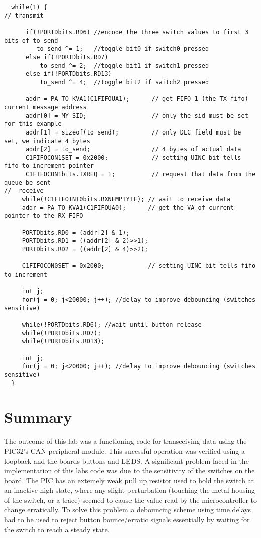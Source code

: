 \documentclass[12pt]{article}
\begin{document}
\begin{lstlisting}
  while(1) {
//­­­­­­­­­­­­­­­­­­­­­ transmit ­­­­­­­­­­­­­­­­­­­­­­­­­­­­­­­­­­­­

      if(!PORTDbits.RD6) //encode the three switch values to first 3 bits of to_send
         to_send ^= 1;   //toggle bit0 if switch0 pressed
      else if(!PORTDbits.RD7)
          to_send ^= 2;  //toggle bit1 if switch1 pressed
      else if(!PORTDbits.RD13)
          to_send ^= 4;  //toggle bit2 if switch2 pressed
      
      addr = PA_TO_KVA1(C1FIFOUA1);      // get FIFO 1 (the TX fifo) current message address
      addr[0] = MY_SID;                  // only the sid must be set for this example
      addr[1] = sizeof(to_send);         // only DLC field must be set, we indicate 4 bytes
      addr[2] = to_send;                 // 4 bytes of actual data
      C1FIFOCON1SET = 0x2000;            // setting UINC bit tells fifo to increment pointer
      C1FIFOCON1bits.TXREQ = 1;          // request that data from the queue be sent
// ­­­­­­­­­­­­­­­­­­­­­­ receive ­­­­­­­­­­­­­­­­­­­­­­­­­­­­­­­­­­­­
     while(!C1FIFOINT0bits.RXNEMPTYIF); // wait to receive data
     addr = PA_TO_KVA1(C1FIFOUA0);      // get the VA of current pointer to the RX FIFO

     PORTDbits.RD0 = (addr[2] & 1);
     PORTDbits.RD1 = ((addr[2] & 2)>>1);
     PORTDbits.RD2 = ((addr[2] & 4)>>2);
          
     C1FIFOCON0SET = 0x2000;            // setting UINC bit tells fifo to increment
     
     int j;
     for(j = 0; j<20000; j++); //delay to improve debouncing (switches sensitive)
     
     while(!PORTDbits.RD6); //wait until button release
     while(!PORTDbits.RD7);
     while(!PORTDbits.RD13);
     
     int j;
     for(j = 0; j<20000; j++); //delay to improve debouncing (switches sensitive)
  }
\end{lstlisting}
\section{Summary}
The outcome of this lab was a functioning code for transceiving data using the PIC32's CAN peripheral module. This sucessful operation was verified using a loopback and the boards buttons and LEDS. A significant problem faced in the implementation of this labs code was due to the sensitivity of the switches on the board. The PIC has an extemely weak pull up resistor used to hold the switch at an inactive high state, where any slight perturbation (touching the metal housing of the switch, or a trace) seemed to cause the value read by the microcontroller to change erratically. To solve this problem a debouncing scheme using time delays had to be used to reject button bounce/erratic signals essentially by waiting for the switch to reach a steady state.
\end{document}
